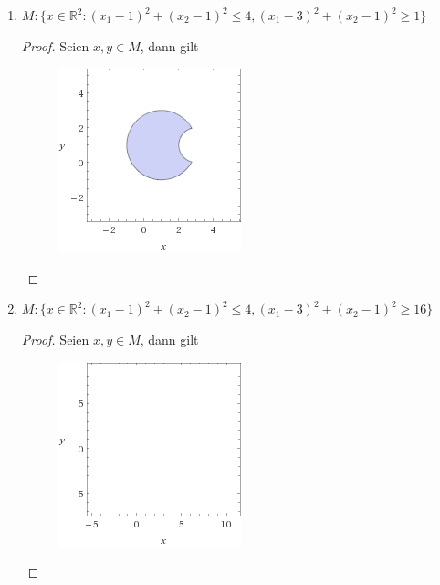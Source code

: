 \documentclass[12pt]{extreport} %
\newcommand{\R}{\mathbb{R}}
\theoremstyle{named}
\theoremstyle{nnamed}
\theoremstyle{itshape}
\theoremstyle{normal}
\begin{document}
\begin{enumerate}
\begin{proof}
\begin{figure}[h!]
 					 \label{fig:fig1}
				\end{figure}
		\end{proof} ~\\
	\item $M \colon \big\{ x \in \R^2 \colon \left( x_1 - 1 \right)^2 + \left( x_2 - 1 \right)^2 \leq 4, \left( x_1 - 3 \right)^2 + \left( x_2 - 1 \right)^2 \geq 1 \big\}$
		\begin{proof}
			Seien $x, y \in M$, dann gilt ~\\
				\begin{figure}[h!] \centering
  					\includegraphics[scale=0.75]{img/suv-ii}
 					 \label{fig:fig2}
				\end{figure}
		\end{proof}
	\item $M \colon \big\{ x \in \R^2 \colon \left( x_1 - 1 \right)^2 + \left( x_2 - 1 \right)^2 \leq 4, \left( x_1 - 3 \right)^2 + \left( x_2 - 1 \right)^2 \geq 16  \big\}$
		\begin{proof}
			Seien $x, y \in M$, dann gilt ~\\
				\begin{figure}[h!] \centering
  					\includegraphics[scale=075]{img/suv-iii}
 					 \label{fig:fig3}
				\end{figure}
		\end{proof}
\end{enumerate}
\end{document}
